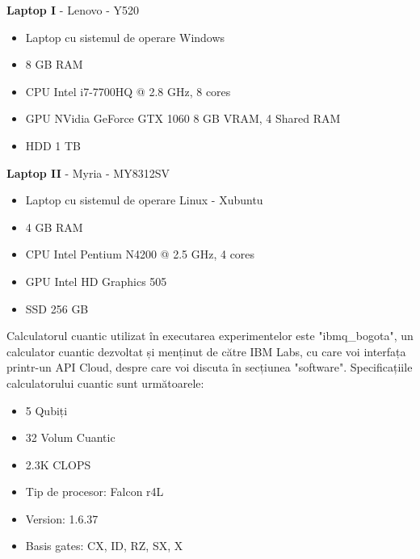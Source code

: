 \documentclass[12pt]{report}
\begin{document}
\vspace{0.5cm}
\textbf{Laptop I} - Lenovo - Y520
\begin{itemize}
    \item Laptop cu sistemul de operare Windows
    \item 8 GB RAM
    \item CPU Intel i7-7700HQ @ 2.8 GHz, 8 cores
    \item GPU NVidia GeForce GTX 1060 8 GB VRAM, 4 Shared RAM
    \item HDD 1 TB
\end{itemize}

\vspace{0.5cm}
\textbf{Laptop II}  - Myria - MY8312SV
\begin{itemize}
    \item Laptop cu sistemul de operare Linux - Xubuntu
    \item 4 GB RAM
    \item CPU Intel Pentium N4200 @ 2.5 GHz, 4 cores
    \item GPU Intel HD Graphics 505
    \item SSD 256 GB
\end{itemize}

Calculatorul cuantic utilizat în executarea experimentelor este "ibmq\_bogota", un calculator cuantic dezvoltat și menținut de către IBM Labs, cu care voi interfața printr-un API Cloud, despre care voi discuta în secțiunea "software". Specificațiile calculatorului cuantic sunt următoarele:
\begin{itemize}
    \item 5 Qubiți
    \item 32 Volum Cuantic
    \item 2.3K CLOPS
    \item Tip de procesor: Falcon r4L
    \item Version: 1.6.37
    \item Basis gates: CX, ID, RZ, SX, X
\end{itemize}
\end{document}
